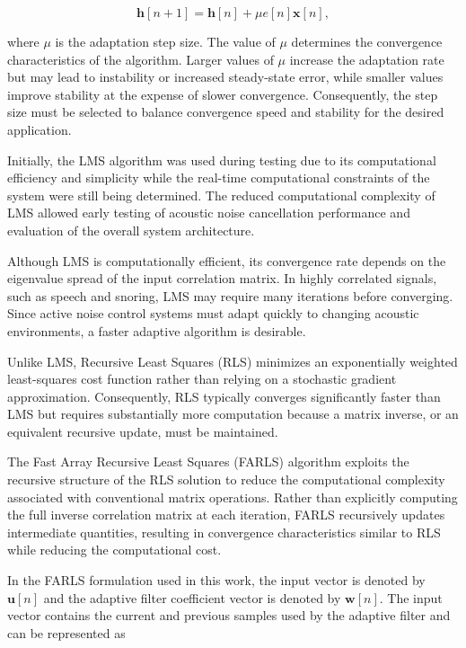 \begin{equation}
\mathbf{h}[n+1]
=
\mathbf{h}[n]
+
\mu e[n]\mathbf{x}[n],
\end{equation}

where $\mu$ is the adaptation step size. The value of $\mu$ determines the convergence characteristics of the algorithm. Larger values of $\mu$ increase the adaptation rate but may lead to instability or increased steady-state error, while smaller values improve stability at the expense of slower convergence. Consequently, the step size must be selected to balance convergence speed and stability for the desired application.

Initially, the LMS algorithm was used during testing due to its computational efficiency and simplicity while the real-time computational constraints of the system were still being determined. The reduced computational complexity of LMS allowed early testing of acoustic noise cancellation performance and evaluation of the overall system architecture.

Although LMS is computationally efficient, its convergence rate depends on the eigenvalue spread of the input correlation matrix. In highly correlated signals, such as speech and snoring, LMS may require many iterations before converging. Since active noise control systems must adapt quickly to changing acoustic environments, a faster adaptive algorithm is desirable.

Unlike LMS, Recursive Least Squares (RLS) minimizes an exponentially weighted least-squares cost function rather than relying on a stochastic gradient approximation. Consequently, RLS typically converges significantly faster than LMS but requires substantially more computation because a matrix inverse, or an equivalent recursive update, must be maintained.

The Fast Array Recursive Least Squares (FARLS) algorithm exploits the recursive structure of the RLS solution to reduce the computational complexity associated with conventional matrix operations. Rather than explicitly computing the full inverse correlation matrix at each iteration, FARLS recursively updates intermediate quantities, resulting in convergence characteristics similar to RLS while reducing the computational cost.

In the FARLS formulation used in this work, the input vector is denoted by $\mathbf{u}[n]$ and the adaptive filter coefficient vector is denoted by $\mathbf{w}[n]$. The input vector contains the current and previous samples used by the adaptive filter and can be represented as

